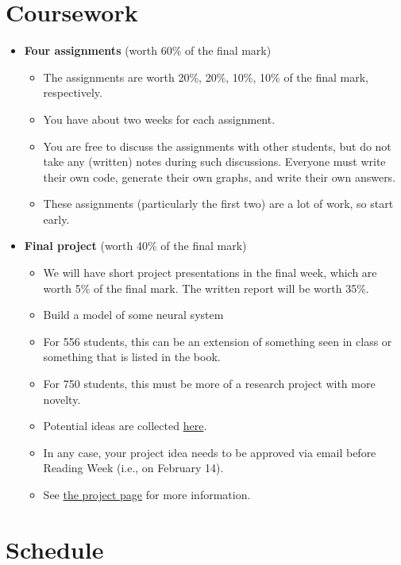 \documentclass[10pt,letterpaper,oneside]{article}
\begin{document}
\newpage

\section{Coursework}

\begin{itemize}
	\item \textbf{Four assignments} (worth 60\% of the final mark)
	\begin{itemize}
		\item The assignments are worth 20\%, 20\%, 10\%, 10\% of the final mark, respectively.
		\item You have about two weeks for each assignment.
		\item You are free to discuss the assignments with other students, but do not take any (written) notes during such discussions. Everyone must write their own code, generate their own graphs, and write their own answers.
		\item These assignments (particularly the first two) are a lot of work, so start early.
	\end{itemize}
	\item \textbf{Final project} (worth 40\% of the final mark)
	\begin{itemize}
		\item We will have short project presentations in the final week, which are worth 5\% of the final mark. The written report will be worth 35\%.
		\item Build a model of some neural system
		\item For 556 students, this can be an extension of something seen in class or something that is listed in the book.
		\item For 750 students, this must be more of a research project with more novelty.
		\item Potential ideas are collected \href{http://compneuro.uwaterloo.ca/courses/syde-750/syde-556-possible-projects.html}{here}.
		\item In any case, your project idea needs to be approved via email before Reading Week (i.e., on February 14).
		\item See \href{http://compneuro.uwaterloo.ca/courses/syde-750/syde-556-possible-projects.html}{the project page} for more information.
	\end{itemize}
\end{itemize}

\section{Schedule}
\end{document}
